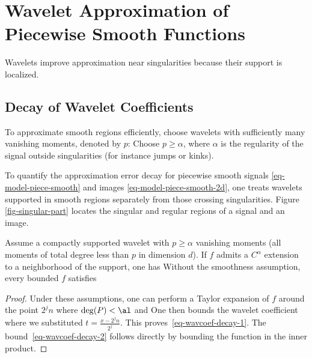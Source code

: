 \section{Wavelet Approximation of Piecewise Smooth Functions}

Wavelets improve approximation near singularities because their support is localized.

\subsection{Decay of Wavelet Coefficients}
\label{subsect-wavdecay}

To approximate smooth regions efficiently, choose wavelets with sufficiently many vanishing moments, denoted by $p$:
Choose $p\geq\alpha$, where $\alpha$ is the regularity of the signal outside singularities (for instance jumps or kinks).


To quantify the approximation error decay for piecewise smooth signals \eqref{eq-model-piece-smooth} and images \eqref{eq-model-piece-smooth-2d}, one treats wavelets supported in smooth regions separately from those crossing singularities. Figure \ref{fig-singular-part} locates the singular and regular regions of a signal and an image.

\begin{prop}
Assume a compactly supported wavelet with $p\geq\alpha$ vanishing moments (all moments of total degree less than $p$ in dimension $d$). If $f$ admits a $C^\alpha$ extension to a neighborhood of the support, one has
Without the smoothness assumption, every bounded $f$ satisfies
\end{prop}

\begin{proof}
Under these assumptions, one can perform a Taylor expansion of $f$ around the point $2^j n$
where $\deg(P)<\al$ and 
One then bounds the wavelet coefficient
where we substituted $t = \frac{x-2^j n}{2^j}$. This proves~\eqref{eq-wavcoef-decay-1}. The bound~\eqref{eq-wavcoef-decay-2} follows directly by bounding the function in the inner product.
\end{proof}

